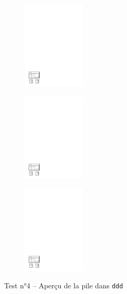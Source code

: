 \begin{figure}[H]
\begin{subfigure}[c]{0.33\textwidth}
		\end{subfigure}
		\begin{subfigure}[c]{0.33\textwidth}
			\centering
			\includegraphics[width=3cm,clip=true,trim=1cm 1cm 15cm 24cm]{../tests/ddd_graph/ddd_4_9}
		\end{subfigure}
		\begin{subfigure}[c]{0.33\textwidth}
			\centering
			\includegraphics[width=3cm,clip=true,trim=1cm 1cm 15cm 24cm]{../tests/ddd_graph/ddd_4_10}
		\end{subfigure}
		\begin{subfigure}[c]{0.33\textwidth}
			\centering
			\includegraphics[width=3cm,clip=true,trim=1cm 1cm 15cm 24cm]{../tests/ddd_graph/ddd_4_11}
		\end{subfigure}
	  \caption{Test n°4 -- Aperçu de la pile dans \texttt{ddd}}
	\end{figure}

\newpage
